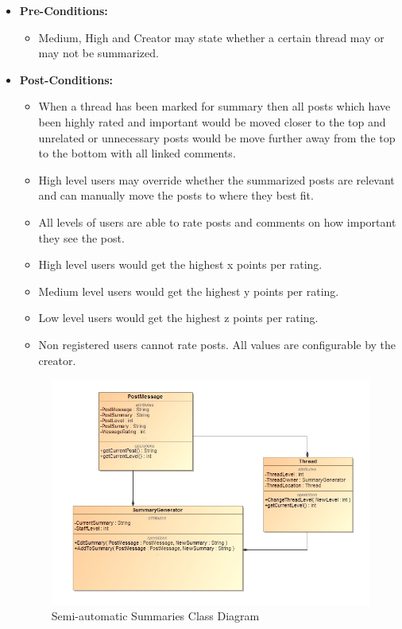 \documentclass[11pt]{article}
\begin{document}
\begin{enumerate}
\begin{itemize}
	\item\textbf{Pre-Conditions: }
	\begin{itemize}
		\item Medium, High and Creator may state whether a certain thread may or may not be summarized.
	\end{itemize}	
	\item\textbf{Post-Conditions: }
	\begin{itemize}
		\item When a thread has been marked for summary then all posts which have been highly rated and important would be moved closer to the top and 	unrelated or unnecessary posts would be move further away from the top to the bottom with all linked comments. 
		\item High level users may override whether the summarized posts are relevant and can manually move the posts to where they best fit.
		\item All levels of users are able to rate posts and comments on how important they see the post.
		\item High level users would get the highest x points per rating.
		\item Medium level users would get the highest y points per rating.
		\item Low level users would get the highest z points per rating.
		\item Non registered users cannot rate posts.
		All values are configurable by the creator.
	\end{itemize}

 \graphicspath{ {../Diagrams/Andrew/} }
			 	  					 	  					 	  		
		\begin{figure}[H]	
			\includegraphics[scale=0.5]{B3ClassDiagram.png}
			\caption{Semi-automatic Summaries Class Diagram}
		\end{figure}
		

\end{itemize}
\end{enumerate}
\end{document}
